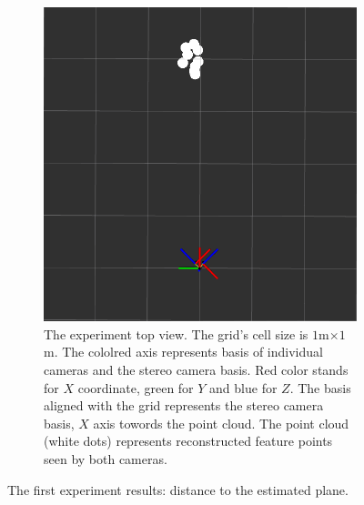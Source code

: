 \begin{figure}[ht]
\begin{subfigure}[ht]{0.49\textwidth}
    \includegraphics[width=\textwidth]{graphics/experiment_1_4m.png}
    \caption[The experiment top view]{The experiment top view. 
    The grid's cell size is $1$m$\times$$1$m.
    The cololred axis represents basis of individual cameras and the stereo camera basis.
    Red color stands for $X$ coordinate, green for $Y$ and blue for $Z$.
    The basis aligned with the grid represents the stereo camera basis, $X$ axis towords the point cloud.
    The point cloud (white dots) represents reconstructed feature points seen by both cameras.}
    \label{fig:exp_1_topview}
  \end{subfigure}
  \caption{The first experiment results: distance to the estimated plane.}
  \label{fig:exp_1_exp}
\end{figure}

